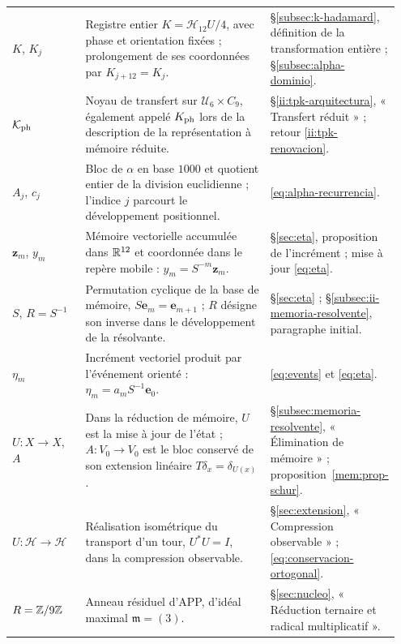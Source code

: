 \begin{longtable}{@{}>{\raggedright\arraybackslash}p{0.19\linewidth}
                    >{\raggedright\arraybackslash}p{0.49\linewidth}
                    >{\raggedright\arraybackslash}p{0.27\linewidth}@{}}
\(K\), \(K_j\)
& Registre entier \(K=\mathcal H_{12}U/4\), avec phase et orientation
  fixées ; prolongement de ses coordonnées par \(K_{j+12}=K_j\).
& \S\ref{subsec:k-hadamard}, définition de la transformation entière ;
  \S\ref{subsec:alpha-dominio}.\\[3pt]

\(\mathcal K_{\rm ph}\)
& Noyau de transfert sur \(\mathcal U_6\times C_9\),
  également appelé \(K_{\rm ph}\) lors de la description de la représentation à
  mémoire réduite.
& \S\ref{ii:tpk-arquitectura}, « Transfert réduit » ;
  retour \eqref{ii:tpk-renovacion}.\\[3pt]

\(A_j\), \(c_j\)
& Bloc de \(\alpha\) en base \(1000\) et quotient entier de la
  division euclidienne ; l'indice \(j\) parcourt le développement positionnel.
& \eqref{eq:alpha-recurrencia}.\\[3pt]

\(\mathbf z_m\), \(y_m\)
& Mémoire vectorielle accumulée dans \(\mathbb R^{12}\) et coordonnée dans le
  repère mobile : \(y_m=S^{-m}\mathbf z_m\).
& \S\ref{sec:eta}, proposition de l'incrément ;
  mise à jour \eqref{eq:eta}.\\[3pt]

\(S\), \(R=S^{-1}\)
& Permutation cyclique de la base de mémoire,
  \(S\mathbf e_m=\mathbf e_{m+1}\) ; \(R\) désigne son inverse
  dans le développement de la résolvante.
& \S\ref{sec:eta} ;
  \S\ref{subsec:ii-memoria-resolvente}, paragraphe initial.\\[3pt]

\(\eta_m\)
& Incrément vectoriel produit par l'événement orienté :
  \(\eta_m=a_mS^{-1}\mathbf e_0\).
& \eqref{eq:events} et \eqref{eq:eta}.\\[3pt]

\(U:X\to X\), \(A\)
& Dans la réduction de mémoire, \(U\) est la mise à jour de l'état ;
  \(A:V_0\to V_0\) est le bloc conservé de son extension linéaire
  \(T\delta_x=\delta_{U(x)}\).
& \S\ref{subsec:memoria-resolvente}, « Élimination de mémoire » ;
  proposition~\ref{mem:prop-schur}.\\[3pt]

\(U:\mathcal H\to\mathcal H\)
& Réalisation isométrique du transport d'un tour,
  \(U^*U=I\), dans la compression observable.
& \S\ref{sec:extension}, « Compression observable » ;
  \eqref{eq:conservacion-ortogonal}.\\[3pt]

\(R=\mathbb Z/9\mathbb Z\)
& Anneau résiduel d'APP, d'idéal maximal
  \(\mathfrak m=(3)\).
& \S\ref{sec:nucleo}, « Réduction ternaire et radical multiplicatif ».\\[3pt]


\end{longtable}
